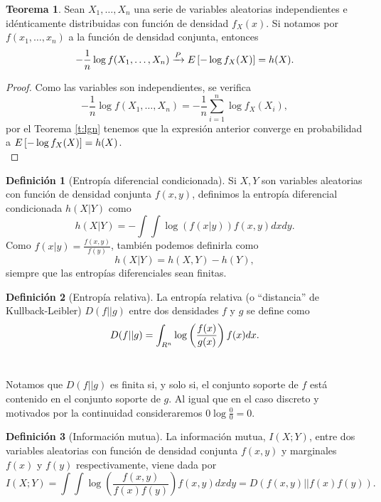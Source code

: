 \documentclass[12pt,a4paper]{report} %
\let\mathbb\relax
\theoremstyle{definition}
\newtheorem{definition}{Definición}[section]
\newtheorem{theorem}{Teorema}[section]
\begin{document}
\begin{theorem}\label{t:mmlog}
  Sean $X_1,\dots, X_n$ una serie de variables aleatorias independientes e idénticamente distribuidas con función de densidad $f_X(x)$. Si notamos por $f(x_1,\dots,x_n)$ a la función de densidad conjunta, entonces\[
-\frac{1}{n}\log f(X_1,\dots, X_n) \xrightarrow[]{P} \mathbb{E}\left [ - \log f_X(X) \right ] = h(X).
  \]
\end{theorem}

\begin{proof}
  Como las variables son independientes, se verifica\[
-\frac{1}{n}\log f(X_1,\dots, X_n) = - \frac{1}{n} \sum_{i=1}^n \log f_X(X_i),
\]
por el Teorema \ref{t:lgn} tenemos que la expresión anterior converge en probabilidad a $\mathbb{E}\left [ - \log f_X(X) \right ] = h(X)$.\\
\end{proof}


\begin{definition}[Entropía diferencial condicionada]
  Si $X,Y$ son variables aleatorias con función de densidad conjunta $f(x,y)$, definimos la entropía diferencial condicionada $h(X|Y)$ como\[
h(X|Y) = -\int\int  \log \left(f(x|y)\right) f(x,y) dxdy.
\]
Como $f(x|y) = \frac{f(x,y)}{f(y)}$, también podemos definirla como\[
h(X|Y) = h(X,Y) - h(Y),
\]
siempre que las entropías diferenciales sean finitas.\\
\end{definition}

\begin{definition}[Entropía relativa]
  La entropía relativa (o ``distancia'' de Kullback-Leibler) $D(f||g)$ entre dos densidades $f$ y $g$ se define como \[
D(f||g) = \int_{\mathbb{R}^n} \log\left( \frac{f(x)}{g(x)}\right)f(x) dx.
  \]\\[-15pt]
\end{definition}

Notamos que $D(f||g)$ es finita si, y solo si, el conjunto soporte de $f$ está contenido en el conjunto soporte de $g$. 
Al igual que en el caso discreto y motivados por la continuidad consideraremos $0\log\frac{0}{0} = 0$.\\

\begin{definition}[Información mutua]\label{def:im_cont}
  La información mutua, $I(X;Y)$, entre dos variables aleatorias con función de densidad conjunta $f(x,y)$ y marginales $f(x)$ y $f(y)$ respectivamente, viene dada por
  \[
I(X;Y) = \int \int \log \left(\frac{f(x,y)}{f(x)f(y)}\right)f(x,y) dxdy = D(f(x,y)||f(x)f(y)).
  \]\\[-15pt]
\end{definition}
\end{document}
